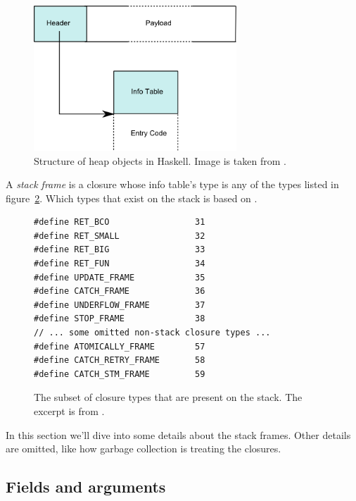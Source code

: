 \begin{figure}
\begin{mdframed}
  \centering
  \includegraphics[width=3.0in]{fig/heap-object}
  \caption{Structure of heap objects in Haskell. Image is taken from \cite{commentary_heap_objects}.}
  \label{fig:heap_object}
\end{mdframed}
\end{figure}

A \emph{stack frame} is a closure whose info table's type is any of the
types listed in figure~\ref{fig:stack_types}. Which types that exist on
the stack is based on \cite{github_scavenge_stack}.

\begin{figure}
\begin{mdframed}
  \begin{verbatim}
#define RET_BCO                 31
#define RET_SMALL               32
#define RET_BIG                 33
#define RET_FUN                 34
#define UPDATE_FRAME            35
#define CATCH_FRAME             36
#define UNDERFLOW_FRAME         37
#define STOP_FRAME              38
// ... some omitted non-stack closure types ...
#define ATOMICALLY_FRAME        57
#define CATCH_RETRY_FRAME       58
#define CATCH_STM_FRAME         59
  \end{verbatim}
  \caption{The subset of closure types that are present on the stack.
The excerpt is from \cite{github_closure_types}.}
  \label{fig:stack_types}
\end{mdframed}
\end{figure}


In this section we'll dive into
some details about the stack frames. Other details
are omitted, like how garbage collection is treating the closures.

\subsection{Fields and arguments}

